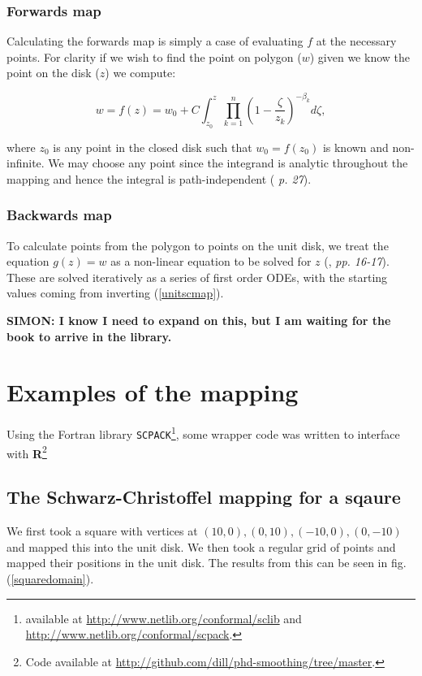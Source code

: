 \documentclass[a4paper,10pt]{amsart}
\newcommand{\sch}{Schwarz-Christoffel }
\begin{document}
\subsubsection{Forwards map}

Calculating the forwards map is simply a case of evaluating $f$ at the necessary points. For clarity if we wish to find the point on polygon ($w$) given we know the point on the disk ($z$) we compute:

\begin{equation}
\label{unitscmap}
w=f(z) = w_0 + C \int_{z_0}^{z} \prod_{k=1}^{n} (1 - \frac{\zeta}{z_k})^{-\beta_k} d\zeta,
\end{equation}

where $z_0$ is any point in the closed disk such that $w_0 = f(z_0)$ is known and non-infinite. We may choose any point since the integrand is analytic throughout the mapping and hence the integral is path-independent (\cite{driscoll} \emph{p. 27}).


\subsubsection{Backwards map}

To calculate points from the polygon to points on the unit disk, we treat the equation $g(z)=w$ as a non-linear equation to be solved for $z$ (\cite{trefethen}, \emph{pp. 16-17}). These are solved iteratively as a series of first order ODEs, with the starting values coming from inverting (\ref{unitscmap}).

\textbf{SIMON: I know I need to expand on this, but I am waiting for the book to arrive in the library.}

\section{Examples of the mapping}

Using the Fortran library \texttt{SCPACK}\footnote{available at \url{http://www.netlib.org/conformal/sclib} and \url{http://www.netlib.org/conformal/scpack}.}, some wrapper code was written to interface with \textbf{R}\footnote{Code available at \url{http://github.com/dill/phd-smoothing/tree/master}.}

\subsection{The \sch mapping for a sqaure}
We first took a square with vertices at $(10,0), (0,10),(-10,0),(0,-10)$ and mapped this into the unit disk. We then took a regular grid of points and mapped their positions in the unit disk. The results from this can be seen in fig. (\ref{squaredomain}).
\end{document}
